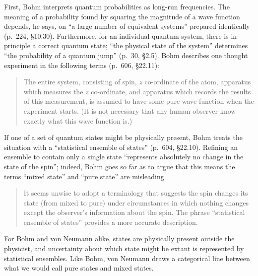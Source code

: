 \documentclass[aps,pra,superscriptaddress,12pt,tightenlines,nofootinbib]{revtex4-2}
\begin{document}
First, Bohm interprets quantum probabilities as long-run frequencies.
The meaning of a probability found by squaring the magnitude of a wave
function depends, he says, on ``a large number of equivalent systems''
prepared identically (p.\ 224, \S 10.30).  Furthermore, for an
individual quantum system, there is in principle a correct quantum
state; ``the physical state of the system'' determines ``the
probability of a quantum jump'' (p.\ 30, \S 2.5).  Bohm describes one
thought experiment in the following terms (p.\ 606, \S 22.11):
\begin{quotation}
\noindent The entire system, consisting of spin, $z$ co-ordinate of
the atom, apparatus which measures the $z$ co-ordinate, and apparatus
which records the results of this measurement, is assumed to have some
pure wave function when the experiment starts.  (It is not necessary
that any human observer know exactly what this wave function is.)
\end{quotation}
If one of a set of quantum states might be physically present, Bohm
treats the situation with a ``statistical ensemble of states''
(p.\ 604, \S 22.10).  Refining an ensemble to contain only a single
state ``represents absolutely no change in the state of the spin'';
indeed, Bohm goes so far as to argue that this means the terms ``mixed
state'' and ``pure state'' are misleading.
\begin{quotation}
\noindent It seems unwise to adopt a terminology that suggests the
spin changes its state (from mixed to pure) under circumstances in
which nothing changes except the observer's information about the
spin.  The phrase ``statistical ensemble of states'' provides a more
accurate description.
\end{quotation}
For Bohm and von Neumann alike, states are physically present outside
the physicist, and uncertainty about which state might be extant is
represented by statistical ensembles.  Like Bohm, von Neumann draws a
categorical line between what we would call pure states and mixed states.
\end{document}
